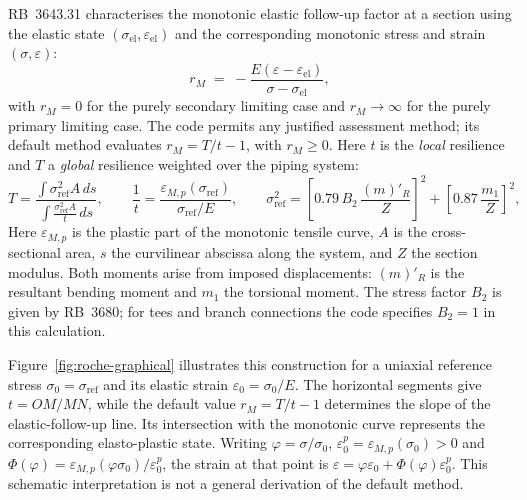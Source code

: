 \documentclass[10pt,a4paper]{article}
\begin{document}
RB~3643.31 characterises the monotonic elastic follow-up factor at a section using the elastic state $(\sigma_{\mathrm{el}},\varepsilon_{\mathrm{el}})$ and the corresponding monotonic stress and strain $(\sigma,\varepsilon)$:
\begin{equation}
r_M \;=\; -\frac{E(\varepsilon-\varepsilon_{\mathrm{el}})}{\sigma-\sigma_{\mathrm{el}}},
\label{eq:rM}
\end{equation}
with $r_M=0$ for the purely secondary limiting case and $r_M\to\infty$ for the purely primary limiting case. The code permits any justified assessment method; its default method evaluates $r_M=T/t-1$, with $r_M\geq0$. Here $t$ is the \emph{local} resilience and $T$ a \emph{global} resilience weighted over the piping system:
\begin{equation}
T = \frac{\int \sigma_{\mathrm{ref}}^2 A\, ds}{\displaystyle\int \frac{\sigma_{\mathrm{ref}}^2 A}{t}\, ds}, \qquad
\frac{1}{t} = \frac{\varepsilon_{M,p}(\sigma_{\mathrm{ref}})}{\sigma_{\mathrm{ref}}/E}, \qquad
\sigma_{\mathrm{ref}}^2 = \left[0.79\,B_2\,\frac{(m)'_R}{Z}\right]^2 + \left[0.87\,\frac{m_1}{Z}\right]^2,
\label{eq:Tglobal}
\end{equation}
Here $\varepsilon_{M,p}$ is the plastic part of the monotonic tensile curve, $A$ is the cross-sectional area, $s$ the curvilinear abscissa along the system, and $Z$ the section modulus. Both moments arise from imposed displacements: $(m)'_R$ is the resultant bending moment and $m_1$ the torsional moment. The stress factor $B_2$ is given by RB~3680; for tees and branch connections the code specifies $B_2=1$ in this calculation.

Figure~\ref{fig:roche-graphical} illustrates this construction for a uniaxial reference stress $\sigma_0=\sigma_{\mathrm{ref}}$ and its elastic strain $\varepsilon_0=\sigma_0/E$. The horizontal segments give $t=OM/MN$, while the default value $r_M=T/t-1$ determines the slope of the elastic-follow-up line. Its intersection with the monotonic curve represents the corresponding elasto-plastic state. Writing $\varphi=\sigma/\sigma_0$, $\varepsilon_0^p=\varepsilon_{M,p}(\sigma_0)>0$ and $\Phi(\varphi)=\varepsilon_{M,p}(\varphi\sigma_0)/\varepsilon_0^p$, the strain at that point is $\varepsilon=\varphi\varepsilon_0+\Phi(\varphi)\varepsilon_0^p$. This schematic interpretation is not a general derivation of the default method.
\end{document}

